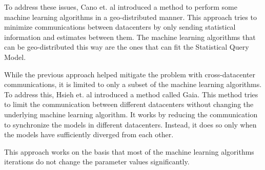 \documentclass[11pt]{article}       %
\begin{document}
To address these issues, Cano et. al\cite{cano2016towards} introduced a method to perform some machine learning algorithms in a geo-distributed manner. This approach tries to minimize communications between datacenters by only sending statistical information and estimates between them. The machine learning algorithms that can be geo-distributed this way are the ones that can fit the Statistical Query Model\cite{kearns1998efficient}.

While the previous approach helped mitigate the problem with cross-datacenter communications, it is limited to only a subset of the machine learning algorithms. To address this, Hsieh et. al\cite{hsieh2017gaia} introduced a method called Gaia. This method tries to limit the communication between different datacenters without changing the underlying machine learning algorithm. It works by reducing the communication to synchronize the models in different datacenters. Instead, it does so only when the models have sufficiently diverged from each other.

This approach works on the basis that most of the machine learning algorithms iterations do not change the parameter values significantly. 

% 

\printbibliography
\end{document}
